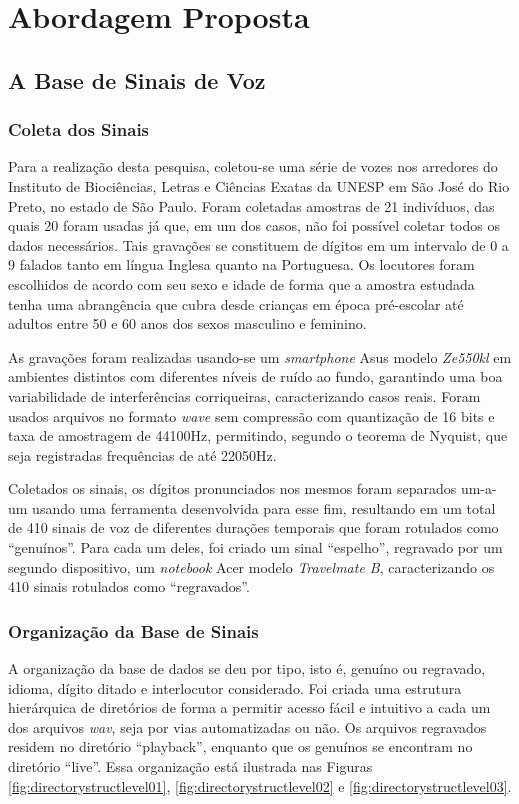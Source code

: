 \chapter{Abordagem Proposta} \label{chap:propApproach}
	\section{A Base de Sinais de Voz}
	    \subsection{Coleta dos Sinais}
		\par Para a realização desta pesquisa, coletou-se uma série de vozes nos arredores do Instituto de Biociências, Letras e Ciências Exatas da UNESP em São José do Rio Preto, no estado de São Paulo. Foram coletadas amostras de 21 indivíduos, das quais 20 foram usadas já que, em um dos casos, não foi possível coletar todos os dados necessários. Tais gravações se constituem de dígitos em um intervalo de 0 a 9 falados tanto em língua Inglesa quanto na Portuguesa. Os locutores foram escolhidos de acordo com seu sexo e idade de forma que a amostra estudada tenha uma abrangência que cubra desde crianças em época pré-escolar até adultos entre 50 e 60 anos dos sexos masculino e feminino.
					
		\par As gravações foram realizadas usando-se um \textit{smartphone} Asus modelo \textit{Ze550kl} em ambientes distintos com diferentes níveis de ruído ao fundo, garantindo uma boa variabilidade de interferências corriqueiras, caracterizando casos reais. Foram usados arquivos no formato \textit{wave} sem compressão com quantização de 16 bits e taxa de amostragem de 44100Hz, permitindo, segundo o teorema de Nyquist, que seja registradas frequências de até 22050Hz.
		
		\par Coletados os sinais, os dígitos pronunciados nos mesmos foram separados um-a-um usando uma ferramenta desenvolvida para esse fim, resultando em um total de 410 sinais de voz de diferentes durações temporais que foram rotulados como ``genuínos''. Para cada um deles, foi criado um sinal ``espelho'',  regravado por um segundo dispositivo, um \textit{notebook} Acer modelo  \textit{Travelmate B}, caracterizando os 410 sinais rotulados como ``regravados''.

	    \subsection{Organização da Base de Sinais}
		\par A organização da base de dados se deu por tipo, isto é, genuíno ou regravado, idioma, dígito ditado e interlocutor considerado. Foi criada uma estrutura hierárquica de diretórios de forma a permitir acesso fácil e intuitivo a cada um dos arquivos \textit{wav}, seja por vias automatizadas ou não. Os arquivos regravados residem no diretório ``playback'', enquanto que os genuínos se encontram no diretório ``live''.	Essa organização está ilustrada nas Figuras \ref{fig:directorystructlevel01}, \ref{fig:directorystructlevel02} e \ref{fig:directorystructlevel03}.
		
